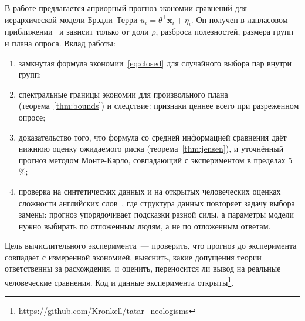 \documentclass{article}
\theoremstyle{definition}
\theoremstyle{remark}
\newcommand{\bx}{\mathbf{x}}
\begin{document}
В работе предлагается априорный прогноз экономии сравнений для иерархической модели Брэдли--Терри $u_i=\theta^{\top}\bx_i+\eta_i$. Он получен в лапласовом приближении~\citep{tierney1986accurate} и зависит только от доли $\rho$, разброса полезностей, размера групп и плана опроса. Вклад работы:
\begin{enumerate}
	\item замкнутая формула экономии~\eqref{eq:closed} для случайного выбора пар внутри групп;
	\item спектральные границы экономии для произвольного плана (теорема~\ref{thm:bounds}) и следствие: признаки ценнее всего при разреженном опросе;
	\item доказательство того, что формула со средней информацией сравнения даёт нижнюю оценку ожидаемого риска (теорема~\ref{thm:jensen}), и уточнённый прогноз методом Монте-Карло, совпадающий с экспериментом в пределах 5\,\%;
	\item проверка на синтетических данных и на открытых человеческих оценках сложности английских слов~\citep{maddela2018word, paetzold2016benchmarking}, где структура данных повторяет задачу выбора замены: прогноз упорядочивает подсказки разной силы, а параметры модели нужно выбирать по отложенным людям, а не по отложенным ответам.
\end{enumerate}

Цель вычислительного эксперимента~--- проверить, что прогноз до эксперимента совпадает с измеренной экономией, выяснить, какие допущения теории ответственны за расхождения, и оценить, переносится ли вывод на реальные человеческие сравнения. Код и данные эксперимента открыты\footnote{\url{https://github.com/Kronkell/tatar_neologisms}}.
\end{document}
